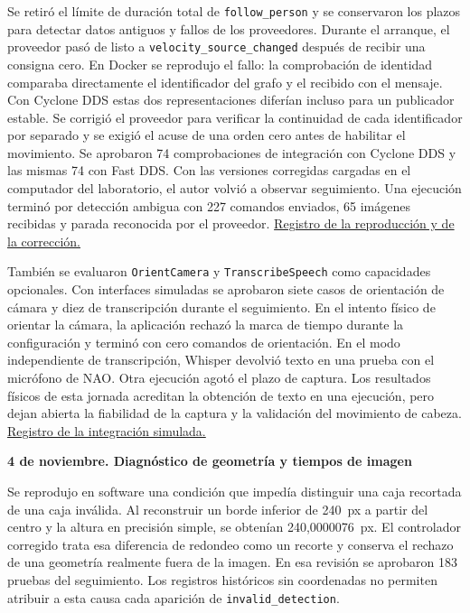 \documentclass[11pt,letterpaper]{article}
\newcommand{\code}[1]{\nolinkurl{#1}}
\begin{document}
Se retiró el límite de duración total de \code{follow_person} y se conservaron los plazos para detectar datos antiguos y fallos de los proveedores. Durante el arranque, el proveedor pasó de listo a \code{velocity_source_changed} después de recibir una consigna cero. En Docker se reprodujo el fallo: la comprobación de identidad comparaba directamente el identificador del grafo y el recibido con el mensaje. Con Cyclone DDS estas dos representaciones diferían incluso para un publicador estable. Se corrigió el proveedor para verificar la continuidad de cada identificador por separado y se exigió el acuse de una orden cero antes de habilitar el movimiento. Se aprobaron 74 comprobaciones de integración con Cyclone DDS y las mismas 74 con Fast DDS. Con las versiones corregidas cargadas en el computador del laboratorio, el autor volvió a observar seguimiento. Una ejecución terminó por detección ambigua con 227 comandos enviados, 65 imágenes recibidas y parada reconocida por el proveedor. \href{https://github.com/jumafe1/portable-hri-reference-system/blob/15178b0e12c30c6aa6af881037431b45ace89202/results/velocity_source_identity_20261021.json}{Registro de la reproducción y de la corrección.}

También se evaluaron \code{OrientCamera} y \code{TranscribeSpeech} como capacidades opcionales. Con interfaces simuladas se aprobaron siete casos de orientación de cámara y diez de transcripción durante el seguimiento. En el intento físico de orientar la cámara, la aplicación rechazó la marca de tiempo durante la configuración y terminó con cero comandos de orientación. En el modo independiente de transcripción, Whisper devolvió texto en una prueba con el micrófono de NAO. Otra ejecución agotó el plazo de captura. Los resultados físicos de esta jornada acreditan la obtención de texto en una ejecución, pero dejan abierta la fiabilidad de la captura y la validación del movimiento de cabeza. \href{https://github.com/jumafe1/portable-hri-reference-system/blob/bbdad283a5ee60fa1256630d7bc5e4ae8e759ff3/results/follow_person_transcription_20261021.json}{Registro de la integración simulada.}

\FloatBarrier

\par\medskip\noindent\textbf{4 de noviembre. Diagnóstico de geometría y tiempos de imagen}\par

Se reprodujo en software una condición que impedía distinguir una caja recortada de una caja inválida. Al reconstruir un borde inferior de 240~px a partir del centro y la altura en precisión simple, se obtenían 240,0000076~px. El controlador corregido trata esa diferencia de redondeo como un recorte y conserva el rechazo de una geometría realmente fuera de la imagen. En esa revisión se aprobaron 183 pruebas del seguimiento. Los registros históricos sin coordenadas no permiten atribuir a esta causa cada aparición de \code{invalid_detection}.
\end{document}
